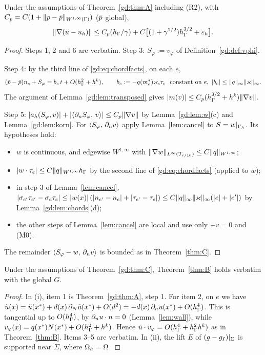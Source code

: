 \begin{theorem}\label{gd:thm:C}
Under the assumptions of Theorem~\ref{gd:thm:A} including (R2), with $C_p=C(1+\lVert p-\bar p\rVert_{W^{1,\infty}(\Gamma)})$ ($\bar p$ global),
\[
\lVert \nabla(\tilde u-u_h)\rVert\le C_p(h_\Gamma/\gamma)+C\bigl[(1+\gamma^{1/2})h_\Gamma^{3/2}+\varepsilon_h\bigr].
\]
\end{theorem}

\begin{proof}
Steps 1, 2 and 6 are verbatim. Step 3: $S_\varphi:=v_\varphi$ of Definition~\ref{gd:def:vphi}.

Step 4: by the third line of \eqref{gd:eq:chordfacts}, on each $e$,
\[
(\tilde p-\bar p)n_e+S_\varphi=b_e\,t+O(h_\Gamma^2+h^k),\qquad b_e:=-q(m_e^\ast)\varkappa_e\tau_e\ \text{ constant on }e,\ |b_e|\le\lVert q\rVert_\infty\lVert \varkappa\rVert_\infty .
\]
The argument of Lemma~\ref{gd:lem:transposed} gives $|m(v)|\le C_p(h_\Gamma^{3/2}+h^k)\lVert \nabla v\rVert$.

Step 5: $|a_h(S_\varphi,v)|+|\langle \partial_n S_\varphi,\, v\rangle|\le C_p\lVert \nabla v\rVert$ by Lemma~\ref{gd:lem:w}(c) and Lemma~\ref{gd:lem:korn}. For $\langle S_\varphi,\, \partial_n v\rangle$ apply Lemma~\ref{lem:cancel} to $S=w|_{\Gamma_h}$. Its hypotheses hold:
\begin{itemize}
\item $w$ is continuous, and edgewise $W^{1,\infty}$ with $\lVert \nabla w\rVert_{L^\infty(\mathcal T_{r/16})}\le C\lVert q\rVert_{W^{1,\infty}}$;
\item $|w\cdot\tau_e|\le C\lVert q\rVert_{W^{1,\infty}}h_\Gamma$ by the second line of \eqref{gd:eq:chordfacts} (applied to $w$);
\item in step 3 of Lemma~\ref{lem:cancel}, $|\sigma_{e'}\tau_{e'}-\sigma_e\tau_e|\le|w(x)|\,(|n_{e'}-n_e|+|\tau_{e'}-\tau_e|)\le C\lVert q\rVert_\infty\lVert \varkappa\rVert_\infty(|e|+|e'|)$ by Lemma~\ref{gd:lem:chords}(d);
\item the other steps of Lemma~\ref{lem:cancel} are local and use only $\div v=0$ and (M0).
\end{itemize}
The remainder $\langle S_\varphi-w,\, \partial_n v\rangle$ is bounded as in Theorem~\ref{thm:C}.
\end{proof}

\begin{theorem}\label{gd:thm:B}
Under the assumptions of Theorem~\ref{gd:thm:C}, Theorem~\ref{thm:B} holds verbatim with the global $G$.
\end{theorem}

\begin{proof}
In (i), item 1 is Theorem~\ref{gd:thm:A}, step 1. For item 2, on $e$ we have $\tilde u(x)=\tilde u(x^\ast)+d(x)\,\partial_N\tilde u(x^\ast)+O(d^2)=-d(x)\,\partial_n u(x^\ast)+O(h_\Gamma^4)$. This is tangential up to $O(h_\Gamma^4)$, by $\partial_n u\cdot n=0$ (Lemma~\ref{lem:wall}), while $v_\varphi(x)=q(x^\ast)N(x^\ast)+O(h_\Gamma^2+h^k)$. Hence $\tilde u\cdot v_\varphi=O(h_\Gamma^4+h_\Gamma^2h^k)$ as in Theorem~\ref{thm:B}. Items 3--5 are verbatim. In (ii), the lift $E$ of $(g-g_I)|_\Sigma$ is supported near $\Sigma$, where $\Omega_h=\Omega$.
\end{proof}

